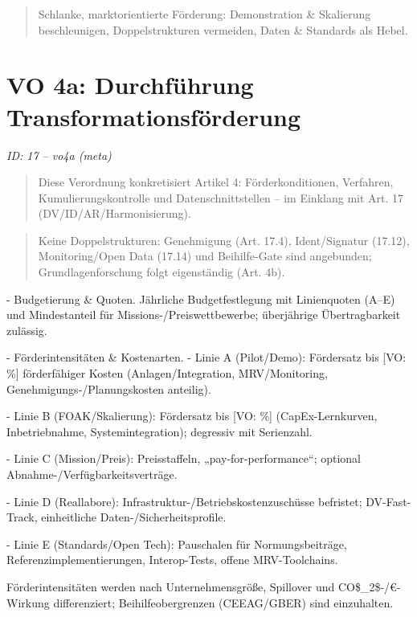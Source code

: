 \documentclass[12pt,a4paper]{scrartcl}
\begin{document}
{\footnotesize\begin{quote}
Schlanke, marktorientierte Förderung: Demonstration \& Skalierung beschleunigen, Doppelstrukturen vermeiden, Daten \& Standards als Hebel.
\end{quote}}



\section[VO 4a: Durchführung Transformationsförderung]{VO 4a: Durchführung Transformationsförderung}
\noindent\textit{ID: 17 -- vo4a (meta)}

\begin{quote}
Diese Verordnung konkretisiert Artikel 4: Förderkonditionen, Verfahren, Kumulierungskontrolle und Datenschnittstellen -- im Einklang mit Art. 17 (DV/ID/AR/Harmonisierung).
\end{quote}

{\footnotesize\begin{quote}
Keine Doppelstrukturen: Genehmigung (Art. 17.4), Ident/Signatur (17.12), Monitoring/Open Data (17.14) und Beihilfe-Gate sind angebunden; Grundlagenforschung folgt eigenständig (Art. 4b).
\end{quote}}


- Budgetierung \& Quoten. Jährliche Budgetfestlegung mit Linienquoten (A--E) und Mindestanteil für Missions-/Preiswettbewerbe; überjährige Übertragbarkeit zulässig.

- Förderintensitäten \& Kostenarten.
- Linie A (Pilot/Demo): Fördersatz bis [VO: \%] förderfähiger Kosten (Anlagen/Integration, MRV/Monitoring, Genehmigungs-/Planungskosten anteilig).

- Linie B (FOAK/Skalierung): Fördersatz bis [VO: \%] (CapEx-Lernkurven, Inbetriebnahme, Systemintegration); degressiv mit Serienzahl.

- Linie C (Mission/Preis): Preisstaffeln, „pay-for-performance“; optional Abnahme-/Verfügbarkeitsverträge.

- Linie D (Reallabore): Infrastruktur-/Betriebskostenzuschüsse befristet; DV-Fast-Track, einheitliche Daten-/Sicherheitsprofile.

- Linie E (Standards/Open Tech): Pauschalen für Normungsbeiträge, Referenzimplementierungen, Interop-Tests, offene MRV-Toolchains.

    Förderintensitäten werden nach Unternehmensgröße, Spillover und CO\$\_2\$-/€-Wirkung differenziert; Beihilfeobergrenzen (CEEAG/GBER) sind einzuhalten.
\end{document}
